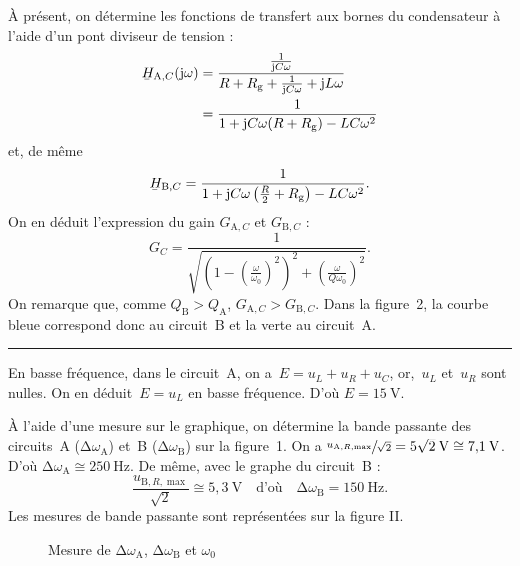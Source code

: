\documentclass[a4paper]{article}
\begin{document}
\begin{multicols}{2}
		À présent, on détermine les fonctions de transfert aux bornes du condensateur à l'aide d'un pont diviseur de tension :
		\begin{align*}
			\ubar{H}_{\text{A},C}(\mathrm{j}\omega) &= \frac{\frac{1}{\mathrm{j}C\omega}}{R + R_\text{g} + \frac{1}{\mathrm{j}C\omega} + \mathrm{j}L\omega}\\
			&= \frac{1}{1 + \mathrm{j}C\omega(R + R_\text{g}) - LC\omega^2} \\
		\end{align*}
		et, de même \[
			\ubar{H}_{\text{B},C} = \frac{1}{1+\mathrm{j}C\omega\left( \frac{R}{2} + R_\text{g} \right) - LC\omega^2}
		.\]
		On en déduit l'expression du gain $G_{\text{A},C}$\/ et $G_{\text{B},C}$\/ : \[
			G_C = \frac{1}{\sqrt{\left( 1 - \left( \frac{\omega}{\omega_0} \right)^2 \right)^2 + \left( \frac{\omega}{Q\omega_0} \right)^2}}
		.\]
		On remarque que, comme $Q_\text{B} > Q_\text{A}$, $G_{\text{A},C} > G_{\text{B},C}$. Dans la figure~2, la courbe bleue correspond donc au circuit~B et la verte au circuit~A.

		\bigskip
		\hrule

		En basse fréquence, dans le circuit~A, on a~$E = u_L + u_R + u_C$, or,~$u_L$\/ et~$u_R$\/ sont nulles. On en déduit~$E = u_L$\/ en basse fréquence. D'où $E = 15\:\mathrm{V}$.

		À l'aide d'une mesure sur le graphique, on détermine la bande passante des circuits~A ($\mathrm{\Delta}\omega_\text{A}$) et~B ($\mathrm{\Delta}\omega_\text{B}$) sur la figure~1. On a $\smash{\sfrac{u_{\text{A},R,\max}}{\sqrt{2}}} = \smash{5\sqrt{2}\:\mathrm{V}} \cong 7{,}1\:\mathrm{V}$. D'où $\mathrm{\Delta}\omega_{\text{A}} \cong 250\:\mathrm{Hz}$.
		De même, avec le graphe du circuit~B : \[
			\frac{u_{\text{B},R,\max}}{\sqrt{2}} \cong 5{,}3\:\mathrm{V}\quad\text{d'où}\quad \mathrm{\Delta}\omega_\text{B} = 150\:\mathrm{Hz}
		.\] Les mesures de bande passante sont représentées sur la figure II.
	\end{multicols}
	\begin{figure}[H]
		\centering
		\caption{Mesure de $\mathrm{\Delta}\omega_\text{A}$, $\mathrm{\Delta}\omega_\text{B}$\/ et $\omega_0$}
	\end{figure}
\end{document}
